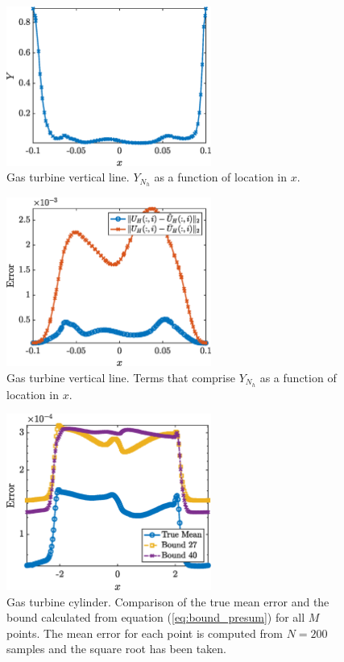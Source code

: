 \documentclass{report}
\begin{document}
% 
\begin{figure}[ht!]
\centering
\includegraphics[width =0.6\textwidth]{Figures/GT_mid_Y.eps}
\caption{Gas turbine vertical line. $Y_{N_h}$ as a function of location in $x$.} 
\label{fig:GT_mid_Y}
\end{figure}
%
% 
\begin{figure}[ht!]
\centering
\includegraphics[width =0.6\textwidth]{Figures/GT_mid_Y_ratio.eps}
\caption{Gas turbine vertical line. Terms that comprise $Y_{N_h}$ as a function of location in $x$.} 
\label{fig:GT_mid_Y_ratio}
\end{figure}
%


% 
\begin{figure}[ht!]
\centering
\includegraphics[width =0.6\textwidth]{Figures/GT_cylinder_eq_27_bound.eps}
\caption{Gas turbine cylinder. Comparison of the true mean error and the bound calculated from equation (\ref{eq:bound_presum}) for all $M$ points. The mean error for each point is computed from $N=200$ samples and the square root has been taken.} 
\label{fig:GT_cylinder_eq_27_bound}
\end{figure}
%
\end{document}
